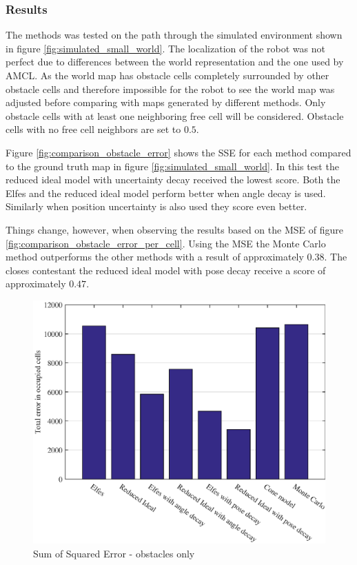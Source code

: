 \subsubsection{Results}
The methods was tested on the path through the simulated environment shown in figure \vref{fig:simulated_small_world}. 
The localization of the robot was not perfect due to differences between the world representation and the one used by AMCL.
As the world map has obstacle cells completely surrounded by other obstacle cells and therefore impossible for the robot to see the world map was adjusted before comparing with maps generated by different methods. Only obstacle cells with at least one neighboring free cell will be considered. Obstacle cells with no free cell neighbors are set to $0.5$. 

Figure \vref{fig:comparison_obstacle_error} shows the SSE for each method compared to the ground truth map in figure \vref{fig:simulated_small_world}. 
In this test the reduced ideal model with uncertainty decay received the lowest score. Both the Elfes and the reduced ideal model perform better when angle decay is used.
Similarly when position uncertainty is also used they score even better. 
 
Things change, however, when observing the results based on the MSE of figure \vref{fig:comparison_obstacle_error_per_cell}. 
Using the MSE the Monte Carlo method outperforms the other methods with a result of approximately \( 0.38\). The closes contestant the reduced ideal model with pose decay receive a score of approximately \(0.47\).

\begin{figure}[htbp]
	\centering
	\includegraphics[scale=1]{figures/static_mapping/comparison_obstacle_error}
	\caption{Sum of Squared Error - obstacles only}
	\label{fig:comparison_obstacle_error}
\end{figure}

